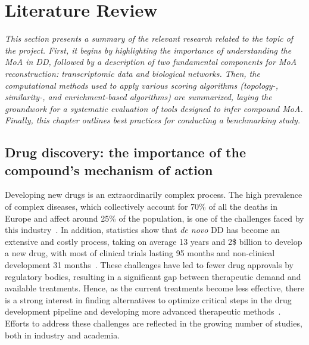﻿%

%

\chapter{Literature Review}
\label{cha:literaturereview}

\textit{This section presents a summary of the relevant research related to the topic of the project.
First, it begins by highlighting the importance of understanding the \gls{MoA} in \gls{DD}, followed by a description of two fundamental components for \gls{MoA} reconstruction: transcriptomic data and biological networks.
Then, the computational methods used to apply various scoring algorithms (topology-, similarity-, and enrichment-based algorithms) are summarized, laying the groundwork for a systematic evaluation of tools designed to infer compound \gls{MoA}.
Finally, this chapter outlines best practices for conducting a benchmarking study.}

\section{Drug discovery: the importance of the compound's mechanism of action} %
\label{sec:drugdiscoverytheimportanceofthecompoundsmechanismofaction}

Developing new drugs is an extraordinarily complex process.
The high prevalence of complex diseases, which collectively account for 70\% of all the deaths in Europe and affect around 25\% of the population, is one of the challenges faced by this industry~\cite{RN43}.
In addition, statistics show that \textit{de novo} \gls{DD} has become an extensive and costly process, taking on average 13 years and 2\$ billion to develop a new drug, with most of clinical trials lasting 95 months and non-clinical development 31 months~\cite{RN55,RN56,RN47}.
These challenges have led to fewer drug approvals by regulatory bodies, resulting in a significant gap between therapeutic demand and available treatments. Hence, as the current treatments become less effective, there is a strong interest in finding alternatives to optimize critical steps in the drug development pipeline and developing more advanced therapeutic methods~\cite{RN44}.
Efforts to address these challenges are reflected in the growing number of studies, both in industry and academia.

